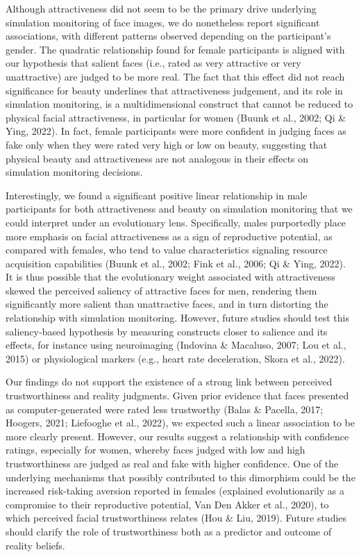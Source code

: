 \documentclass[
  man,floatsintext]{apa6}
\begin{document}
Although attractiveness did not seem to be the primary drive underlying simulation monitoring of face images, we do nonetheless report significant associations, with different patterns observed depending on the participant's gender. The quadratic relationship found for female participants is aligned with our hypothesis that salient faces (i.e., rated as very attractive or very unattractive) are judged to be more real. The fact that this effect did not reach significance for beauty underlines that attractiveness judgement, and its role in simulation monitoring, is a multidimensional construct that cannot be reduced to physical facial attractiveness, in particular for women (Buunk et al., 2002; Qi \& Ying, 2022). In fact, female participants were more confident in judging faces as fake only when they were rated very high or low on beauty, suggesting that physical beauty and attractiveness are not analogous in their effects on simulation monitoring decisions.

Interestingly, we found a significant positive linear relationship in male participants for both attractiveness and beauty on simulation monitoring that we could interpret under an evolutionary lens. Specifically, males purportedly place more emphasis on facial attractiveness as a sign of reproductive potential, as compared with females, who tend to value characteristics signaling resource acquisition capabilities (Buunk et al., 2002; Fink et al., 2006; Qi \& Ying, 2022). It is thus possible that the evolutionary weight associated with attractiveness skewed the perceived saliency of attractive faces for men, rendering them significantly more salient than unattractive faces, and in turn distorting the relationship with simulation monitoring.
However, future studies should test this saliency-based hypothesis by measuring constructs closer to salience and its effects, for instance using neuroimaging (Indovina \& Macaluso, 2007; Lou et al., 2015) or physiological markers
(e.g., heart rate deceleration, Skora et al., 2022).

Our findings do not support the existence of a strong link between perceived trustworthiness and reality judgments. Given prior evidence that faces presented as computer-generated were rated less trustworthy (Balas \& Pacella, 2017; Hoogers, 2021; Liefooghe et al., 2022), we expected such a linear association to be more clearly present. However, our results suggest a relationship with confidence ratings, especially for women, whereby faces judged with low and high trustworthiness are judged as real and fake with higher confidence.
One of the underlying mechanisms that possibly contributed to this dimorphism could be the increased risk-taking aversion reported in females (explained evolutionarily as a compromise to their reproductive potential, Van Den Akker et al., 2020), to which perceived facial trustworthiness relates (Hou \& Liu, 2019). Future studies should clarify the role of trustworthiness both as a predictor and outcome of reality beliefs.
\end{document}
